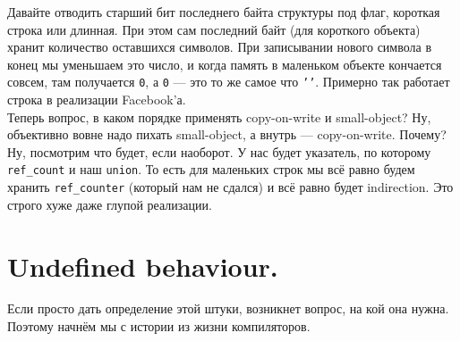 \documentclass{article}
\begin{document}
    Давайте отводить старший бит последнего байта структуры под флаг, короткая строка или длинная. При этом сам последний байт (для короткого объекта) хранит количество оставшихся символов. При записывании нового символа в конец мы уменьшаем это число, и когда память в маленьком объекте кончается совсем, там получается \texttt{0}, а \texttt{0} --- это то же самое что \texttt{'\0'}. Примерно так работает строка в реализации Facebook'а.\\
    Теперь вопрос, в каком порядке применять copy-on-write и small-object? Ну, объективно вовне надо пихать small-object, а внутрь --- copy-on-write. Почему? Ну, посмотрим что будет, если наоборот. У нас будет указатель, по которому \texttt{ref_count} и наш \texttt{union}. То есть для маленьких строк мы всё равно будем хранить \texttt{ref_counter} (который нам не сдался) и всё равно будет indirection. Это строго хуже даже глупой реализации.
    \section{Undefined behaviour.}
    Если просто дать определение этой штуки, возникнет вопрос, на кой она нужна. Поэтому начнём мы с истории из жизни компиляторов.
\end{document}
